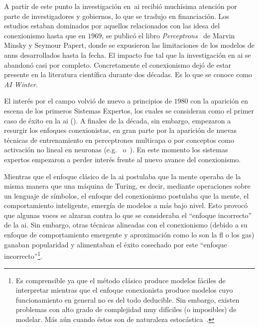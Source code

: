 A partir de este punto la investigación en~\ac{ai} recibió muchísima atención por parte de investigadores y gobiernos, lo que se tradujo en financiación. Los estudios estaban dominados por aquellos relacionados con las idesa del conexionismo hasta que en $1969$, se publicó el libro \textit{Perceptrons}~\cite{minsky1969perceptrons} de Marvin Minsky y Seymour Papert, donde se expusieron las limitaciones de los modelos de \acp{ann} desarrollados hasta la fecha. El impacto fue tal que la investigación en \gls{ai} se abandonó casi por completo. Concretamente el conexionismo dejó de estar presente en la literatura científica durante dos décadas. Es lo que se conoce como \textit{AI Winter}.

El interés por el campo volvió de nuevo a principios de $1980$ con la aparición en escena de los primeros Sistemas Expertos, los cuales se consideran como el primer caso de éxito en la \gls{ai}  (\cite{russell2003artificial}). A finales de la década, sin embargo, empezaron a resurgir los enfoques conexionistas, en gran parte por la aparición de nuevas técnicas de entrenamiento en perceptrones multicapa o por conceptos como activación no lineal en neuronas (e.g.~\cite{rumelhart1985learning} o~\cite{cybenko1989approximation}). En este momento los sistemas expertos empezaron a perder interés frente al nuevo avance del conexionismo.

Mientras que el enfoque clásico de la \ac{ai} postulaba que la mente operaba de la misma manera que una máquina de Turing, es decir, mediante operaciones sobre un lenguaje de símbolos, el enfoque del conexionismo postulaba que la mente, el comportamiento inteligente, emergía de modelos a más bajo nivel. Esto provocó que algunas voces se alzaran contra lo que se consideraba el \enquote{enfoque incorrecto} de la \ac{ai}. Sin embargo, otras técnicas alineadas con el conexionismo (debido a su enfoque de comportamiento emergente y aproximación como lo son la \ac{fl} o los \acp{ga}) ganaban popularidad y alimentaban el éxito cosechado por este \enquote{enfoque incorrecto}\footnote{Es comprensible ya que el método clásico produce modelos fáciles de interpretar mientras que el enfoque conexionista produce modelos cuyo funcionamiento en general no es del todo deducible. Sin embargo, existen problemas con alto grado de complejidad muy difíciles (o imposibles) de modelar. Más aún cuando éstos son de naturaleza estocástica~\cite{siddique2013computational}.}.

